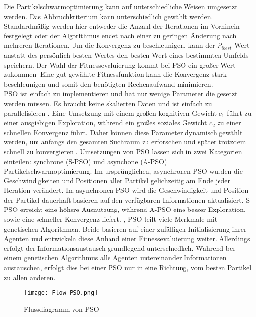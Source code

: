 Die Partikelschwarmoptimierung kann auf unterschiedliche Weisen umgesetzt werden.
Das Abbruchkriterium kann unterschiedlich gewählt werden. Standardmäßig werden hier entweder die Anzahl der Iterationen im Vorhinein festgelegt oder der Algorithmus endet nach einer zu geringen Änderung nach mehreren Iterationen. 
Um die Konvergenz zu beschleunigen, kann der $P_{ibest}$-Wert anstatt des persönlich besten Wertes den besten Wert eines bestimmten Umfelds speichern.
Der Wahl der Fitnessevaluierung kommt bei PSO ein großer Wert zukommen. Eine gut gewählte Fitnessfunktion kann die Konvergenz stark beschleunigen und somit den benötigten Rechenaufwand minimieren.\\
PSO ist einfach zu implementieren und hat nur wenige Parameter die gesetzt werden müssen. Es braucht keine skalierten Daten und ist einfach zu parallelisieren \cite{poli2007particle}.
Eine Umsetzung mit einem großen kognitiven Gewicht $c_1$ führt zu einer ausgiebigen Exploration, während ein großes soziales Gewicht $c_2$ zu einer schnellen Konvergenz führt. Daher können diese Parameter dynamisch gewählt werden, um anfangs den gesamten Suchraum zu erforschen und später trotzdem schnell zu konvergieren \cite{suganthan1999particle}. 
Umsetzungen von PSO lassen sich in zwei Kategorien einteilen: synchrone (S-PSO) und asynchone (A-PSO) Partikelschwarmoptimierung. Im ursprünglichen, asynchronen PSO wurden die Geschwindigkeiten und Positionen aller Partikel gelichzeitig am Ende jeder Iteration verändert. Im asynchronen PSO wird die Geschwindigkeit und Position der Partikel dauerhaft basieren auf den verfügbaren Informationen aktualisiert.  S-PSO erreicht eine höhere Ausnutzung, während A-PSO eine besser Exploration, sowie eine schneller Konvergenz liefert. \cite{carlisle2001g}, \cite*{ab2014synchronous}
PSO teilt viele Merkmale mit genetischen Algorithmen. Beide basieren auf einer zufälligen Initialisierung ihrer Agenten und entwickeln diese Anhand einer Fitnessevaluierung weiter. Allerdings erfolgt der Informationsaustausch grundlegend unterschiedlich. Während bei einem genetischen Algorithmus alle Agenten untereinander Informationen austauschen, erfolgt dies bei einer PSO nur in eine Richtung, vom besten Partikel zu allen anderen.\\


\begin{figure}
  \centering
  \texttt{[image: Flow\_PSO.png]}
  \caption{Flussdiagramm von PSO}
  \label{fig:Figure_PSO}
\end{figure}


